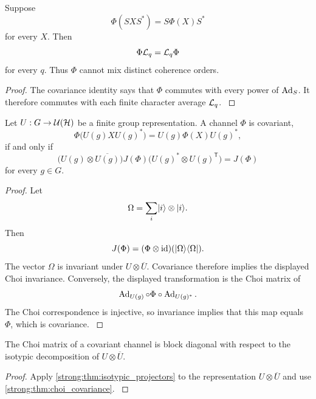 \begin{theorem}\label{strong:theorem:023}\label{strong:thm:covariant_channel}
Suppose
\[
\Phi(SXS^*)=S\Phi(X)S^*
\]
for every \(X\). Then
\[
\Phi\Lcal_q=\Lcal_q\Phi
\]
for every \(q\). Thus \(\Phi\) cannot mix distinct coherence orders.
\end{theorem}

\begin{proof}\label{strong:proof:034}
The covariance identity says that \(\Phi\) commutes with every power of \(\operatorname{Ad}_S\). It therefore commutes with each finite character average \(\Lcal_q\).
\label{strong:proof:034:end}\end{proof}

\begin{theorem}\label{strong:theorem:024}\label{strong:thm:choi_covariance}
Let \(U:G\to\Ucal(\Hcal)\) be a finite group representation. A channel \(\Phi\) is covariant,
\[
\Phi\bigl(U(g)XU(g)^*\bigr)
=
U(g)\Phi(X)U(g)^*,
\]
if and only if
\[
\bigl(U(g)\otimes\overline{U(g)}\bigr)
J(\Phi)
\bigl(U(g)^*\otimes U(g)^{\mathsf T}\bigr)
=
J(\Phi)
\]
for every \(g\in G\).
\end{theorem}

\begin{proof}\label{strong:proof:035}
Let
\[
\Omega=\sum_i\lvert i\rangle\otimes\lvert i\rangle.
\]
Then
\[
J(\Phi)=(\Phi\otimes\operatorname{id})(\lvert \Omega\rangle\langle \Omega\rvert).
\]
The vector \(\Omega\) is invariant under \(U\otimes\overline U\). Covariance therefore implies the displayed Choi invariance. Conversely, the displayed transformation is the Choi matrix of
\[
\operatorname{Ad}_{U(g)}\circ\Phi\circ\operatorname{Ad}_{U(g)^*}.
\]
The Choi correspondence is injective, so invariance implies that this map equals \(\Phi\), which is covariance.
\label{strong:proof:035:end}\end{proof}

\begin{corollary}\label{strong:corollary:009}\label{strong:cor:choi_packets}
The Choi matrix of a covariant channel is block diagonal with respect to the isotypic decomposition of \(U\otimes\overline U\).
\end{corollary}

\begin{proof}\label{strong:proof:036}
Apply \cref{strong:thm:isotypic_projectors} to the representation \(U\otimes\overline U\) and use \cref{strong:thm:choi_covariance}.
\label{strong:proof:036:end}\end{proof}

